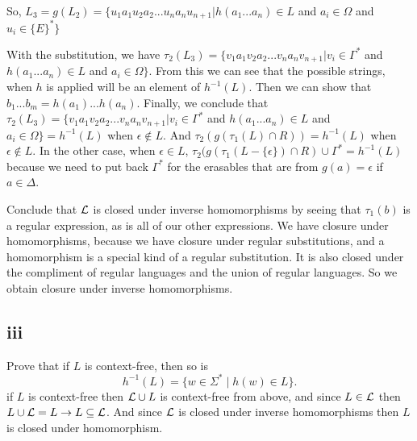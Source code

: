 \documentclass[12pt]{article}
\begin{document}
So, $L_3 = g(L_2)=\{u_1a_1u_2a_2...u_na_nu_{n+1} | h(a_1...a_n) \in L$ and $a_i \in \Omega$ and $u_i \in \{E\}^* \}$ \newline

With the substitution, we have $\tau_2(L_3)= \{v_1a_1v_2a_2...v_na_nv_{n+1} | v_i \in \Gamma^*$ and $h(a_1...a_n) \in L$ and $a_i \in \Omega \}$. From this we can see that the possible strings, when $h$ is applied will be an element of $h^{-1}(L)$. Then we can show that $b_1...b_m=h(a_1)...h(a_n)$. Finally, we conclude that $\tau_2(L_3)= \{v_1a_1v_2a_2...v_na_nv_{n+1} | v_i \in \Gamma^*$ and $h(a_1...a_n) \in L$ and $a_i \in \Omega \} = h^{-1}(L)$ when $\epsilon \not \in L$. And $\tau_2(g(\tau_1(L) \cap R)) = h^{-1}(L)$ when $\epsilon \not \in L$. In the other case, when $\epsilon \in L$, $\tau_2(g(\tau_1(L-\{\epsilon\}) \cap R) \cup \Gamma^* = h^{-1}(L)$ because we need to put back $\Gamma^*$ for the erasables that are from $g(a) = \epsilon$ if $a\in\Delta$. 

\medskip

Conclude that ${\cal L}$ is closed under inverse homomorphisms by seeing that $\tau_1(b)$ is a regular expression, as is all of our other expressions. We have closure under homomorphisms, because we have closure under regular substitutions, and a homomorphism is a special kind of a regular substitution. It is also closed under the compliment of regular languages and the union of regular languages. So we obtain closure under inverse homomorphisms. 

\subsection*{iii}

Prove that if $L$ is context-free,
then so is 
$$h^{-1}(L) = \{w\in \Sigma^* \mid  h(w) \in L\}.$$
if $L$ is context-free then ${\cal L} \cup L$ is context-free from above, and since $L \in {\cal L}$ then $L \cup {\cal L} = L \rightarrow L \subseteq {\cal L}$.  And since ${\cal L}$ is closed under inverse homomorphisms then $L$ is closed under homomorphism.
\end{document}
